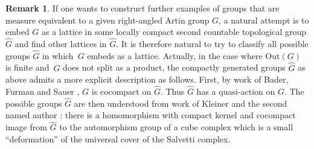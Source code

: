 \documentclass[JEP,XML,SOM,Unicode,NoFloatCountersInSection,published]{cedram}
\theoremstyle{plain}
\theoremstyle{definition}
\newtheorem{rk}[theo]{Remark}
\newcommand{\Out}{\mathrm{Out}}
\begin{document}
\begin{rk}
If one wants to construct further examples of groups that are measure equivalent to a given right-angled Artin group $G$, a natural attempt is to embed $G$ as a lattice in some locally compact second countable topological group $\hat{G}$ and find other lattices in $\hat{G}$. It is therefore natural to try to classify all possible groups $\hat{G}$ in which~$G$ embeds as a lattice. Actually, in the case where $\Out(G)$ is finite and~$G$ does not split as a product, the compactly generated groups $\hat G$ as above admits a more explicit description as follows. First, by work of Bader, Furman and Sauer \hbox{\cite[Th.\,1.4 \& Th.\,A]{bader2020lattice}}, $G$ is cocompact on $\hat G$. Thus $\hat G$ has a quasi-action on $G$. The possible groups $\hat{G}$ are then understood from work of Kleiner and the second named author \cite{KH}: there is a homomorphism with compact kernel and cocompact image from $\hat{G}$ to the automorphism group of a cube complex which is a small ``deformation'' of the universal cover of the Salvetti complex.
\end{rk}

\backmatter


\end{document}
